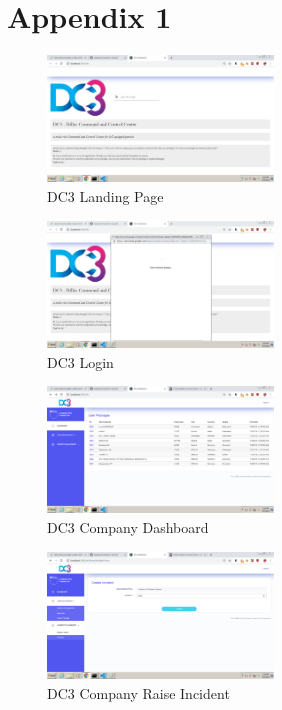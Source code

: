 \chapter{Appendix 1}
\label{appendix:listing1}

\begin{figure}[htp]
    \centering
    \includegraphics[width=6cm]{images/screenshots/Home.jpg}
    \caption{DC3 Landing Page}
    \label{fig:}
\end{figure}

\begin{figure}[htp]
    \centering
    \includegraphics[width=6cm]{images/screenshots/Login.jpg}
    \caption{DC3 Login}
    \label{fig:}
\end{figure}

\begin{figure}[htp]
    \centering
    \includegraphics[width=6cm]{images/screenshots/Company_Dashboard.png}
    \caption{DC3 Company Dashboard}
    \label{fig:}
\end{figure}

\begin{figure}[htp]
    \centering
    \includegraphics[width=6cm]{images/screenshots/Company_Raise_Incident.png}
    \caption{DC3 Company Raise Incident}
    \label{fig:}
\end{figure}

